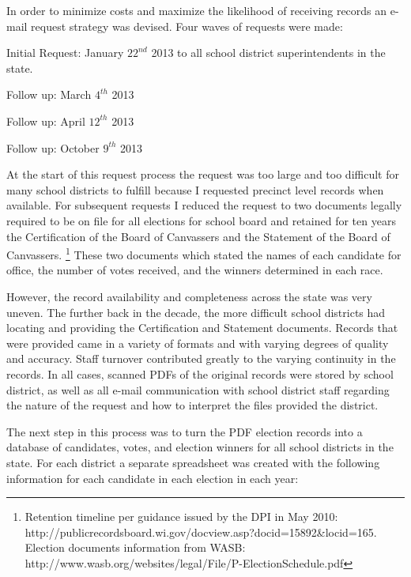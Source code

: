 In order to minimize costs and maximize the likelihood of receiving records an 
e-mail request strategy was devised. Four waves of requests were made: 

\begin{myitemize}
\item Initial Request: January $22^{nd}$ 2013 to all school district superintendents in 
the state. 
\item Follow up: March $4^{th}$ 2013
\item Follow up: April $12^{th}$ 2013
\item Follow up: October $9^{th}$ 2013
\end{myitemize}

At the start of this request process the request was too large and too difficult 
for many school districts to fulfill because I requested precinct level records 
when available. For subsequent requests I reduced the request 
to two documents legally required to be on file for all elections for school board 
and retained for ten years the Certification of the Board of Canvassers and the 
Statement of the Board of Canvassers. \footnote{Retention timeline per guidance issued 
by the DPI in May 2010: http://publicrecordsboard.wi.gov/docview.asp?docid=15892\&locid=165. 
Election documents information from WASB: http://www.wasb.org/websites/legal/File/P-ElectionSchedule.pdf} 
These two documents which stated the names of each candidate for office, the 
number of votes received, and the winners determined in each race. 

However, the record availability and completeness across the state was very uneven. The further 
back in the decade, the more difficult school districts had locating and providing 
the Certification and Statement documents. Records that were provided came in a 
variety of formats and with varying degrees of quality and accuracy. Staff turnover 
contributed greatly to the varying continuity in the records. In all cases, 
scanned PDFs of the original records were stored by school district, as well as 
all e-mail communication with school district staff regarding the nature of the 
request and how to interpret the files provided the district. 

The next step in this process was to turn the PDF election records into a database 
of candidates, votes, and election winners for all school districts in the state. 
For each district a separate spreadsheet was created with the following information 
for each candidate in each election in each year:

